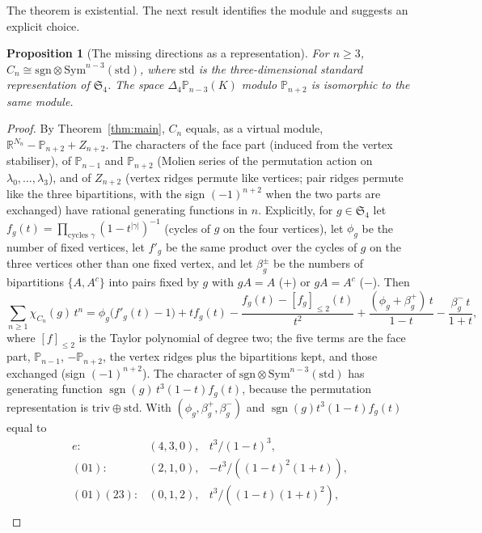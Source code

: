 \documentclass[11pt,a4paper]{article}
\newtheorem{proposition}[theorem]{Proposition}
\theoremstyle{definition}
\theoremstyle{remark}
\newcommand{\Pol}{\mathbb P}
\begin{document}
The theorem is existential. The next result identifies the module and
suggests an explicit choice.

\begin{proposition}[The missing directions as a representation]
\label{prop:character}
For \(n\ge3\), \(C_n\cong\mathrm{sgn}\otimes\mathrm{Sym}^{n-3}(\mathrm{std})\),
where \(\mathrm{std}\) is the three-dimensional standard representation of
\(\mathfrak S_4\). The space \(\Delta_4\Pol_{n-3}(K)\) modulo \(\Pol_{n+2}\) is
isomorphic to the same module.
\end{proposition}

\begin{proof}
By Theorem~\ref{thm:main}, \(C_n\) equals, as a virtual module,
\(\mathbb R^{N_n}-\Pol_{n+2}+Z_{n+2}\). The characters of the face part
(induced from the vertex stabiliser), of \(\Pol_{n-1}\) and \(\Pol_{n+2}\)
(Molien series of the permutation action on \(\lambda_0,\dots,\lambda_3\)),
and of \(Z_{n+2}\) (vertex ridges permute like vertices; pair ridges permute
like the three bipartitions, with the sign \((-1)^{n+2}\) when the two parts
are exchanged) have rational generating functions in \(n\). Explicitly, for
\(g\in\mathfrak S_4\) let \(f_g(t)=\prod_{\text{cycles }\gamma}(1-t^{|\gamma|})^{-1}\)
(cycles of \(g\) on the four vertices), let \(\phi_g\) be the number of fixed
vertices, let \(f'_g\) be the same product over the cycles of \(g\) on the
three vertices other than one fixed vertex, and let \(\beta^\pm_g\) be the
numbers of bipartitions \(\{A,A^c\}\) into pairs fixed by \(g\) with
\(gA=A\) (\(+\)) or \(gA=A^c\) (\(-\)). Then
\[
 \sum_{n\ge1}\chi_{C_n}(g)\,t^n
 =\phi_g\bigl(f'_g(t)-1\bigr)+t f_g(t)-\frac{f_g(t)-[f_g]_{\le2}(t)}{t^2}
 +\frac{(\phi_g+\beta^+_g)\,t}{1-t}-\frac{\beta^-_g\,t}{1+t},
\]
where \([f]_{\le2}\) is the Taylor polynomial of degree two; the five terms
are the face part, \(\Pol_{n-1}\), \(-\Pol_{n+2}\), the vertex ridges plus
the bipartitions kept, and those exchanged (sign \((-1)^{n+2}\)). The
character of \(\mathrm{sgn}\otimes\mathrm{Sym}^{n-3}(\mathrm{std})\) has
generating function \(\operatorname{sgn}(g)\,t^3(1-t)f_g(t)\), because the
permutation representation is \(\mathrm{triv}\oplus\mathrm{std}\). With
\((\phi_g,\beta^+_g,\beta^-_g)\) and \(\operatorname{sgn}(g)t^3(1-t)f_g(t)\) equal to
\[
\begin{array}{lll}
 e:&(4,3,0),&t^3/(1-t)^3,\\
 (01):&(2,1,0),&-t^3/((1-t)^2(1+t)),\\
 (01)(23):&(0,1,2),&t^3/((1-t)(1+t)^2),\\

\end{array}\]
\end{proof}
\end{document}
